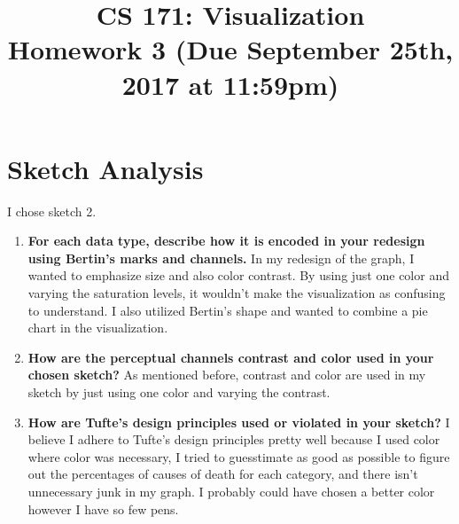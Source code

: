\documentclass[11pt]{article}
\begin{document}
\title{
  CS 171: Visualization \\
  \Large{Homework 3 (Due September 25th, 2017 at 11:59pm)}
}
\date{}

\maketitle

\vspace{-1cm}


\section*{Sketch Analysis}
I chose sketch 2.
\begin{enumerate}
  \item \textbf{For each data type, describe how it is encoded in your redesign using Bertin's marks and channels.} \newline
  	In my redesign of the graph, I wanted to emphasize size and also color contrast. By using just one color and varying the saturation levels, it wouldn't make the visualization as confusing to understand. I also utilized Bertin's shape and wanted to combine a pie chart in the visualization.
	
  \item \textbf{How are the perceptual channels contrast and color used in your chosen sketch?} \newline
  As mentioned before, contrast and color are used in my sketch by just using one color and varying the contrast. 
  
  \item \textbf{How are Tufte's design principles used or violated in your sketch?} \newline
  I believe I adhere to Tufte's design principles pretty well because I used color where color was necessary, I tried to guesstimate as good as possible to figure out the percentages of causes of death for each category, and there isn't unnecessary junk in my graph. I probably could have chosen a better color however I have so few pens. 
  
\end{enumerate}
\end{document}
